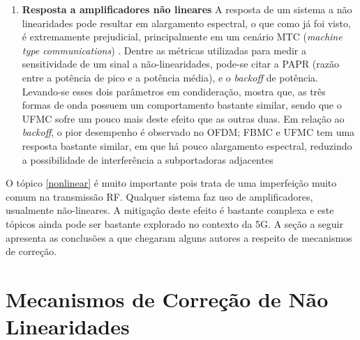 \begin{enumerate}
\item \textbf{Resposta a amplificadores não lineares}\label{nonlinear}
A resposta de um sistema a não linearidades pode resultar em alargamento espectral, o que como já foi visto, é extremamente prejudicial, principalmente em um cenário MTC (\textit{machine type communications}) \cite{YinshengLi}. Dentre as métricas utilizadas para medir a sensitividade de um sinal a não-linearidades, pode-se citar a PAPR (razão entre a potência de pico e a potência média), e o \textit{backoff}  de potência.
Levando-se esses dois parâmetros em condideração, \cite{Eeckhaute} mostra que, as três formas de onda possuem um comportamento bastante similar, sendo que o UFMC sofre um pouco mais deste efeito que as outras duas. Em relação ao \textit{backoff}, o pior desempenho é observado no OFDM; FBMC e UFMC tem uma resposta bastante similar, em que há pouco alargamento espectral, reduzindo a possibilidade de interferência a subportadoras adjacentes 
\end{enumerate}

O tópico \ref{nonlinear} é muito importante pois trata de uma imperfeição muito comum na transmissão RF. Qualquer sistema faz uso de amplificadores, usualmente não-lineares. A mitigação deste efeito é bastante complexa e este tópicos ainda pode ser bastante explorado no contexto da 5G. A seção a seguir apresenta as conclusões a que chegaram alguns autores a respeito de mecanismos de correção. 

\section{Mecanismos de Correção de Não Linearidades}

